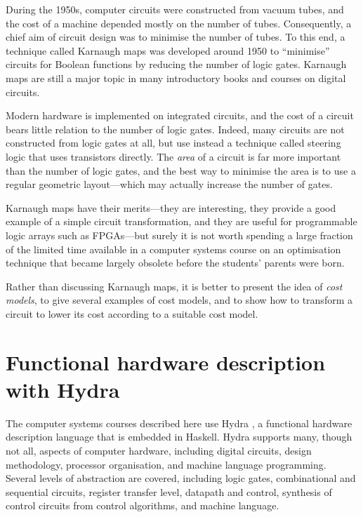 \documentclass[submission,copyright,creativecommons]{eptcs}
\begin{document}
During the 1950s, computer circuits were constructed from vacuum
tubes, and the cost of a machine depended mostly on the number of
tubes.  Consequently, a chief aim of circuit design was to minimise
the number of tubes.  To this end, a technique called Karnaugh maps
was developed around 1950 to ``minimise'' circuits for Boolean
functions by reducing the number of logic gates.  Karnaugh maps are
still a major topic in many introductory books and courses on digital
circuits.

Modern hardware is implemented on integrated circuits, and the cost of
a circuit bears little relation to the number of logic gates.  Indeed,
many circuits are not constructed from logic gates at all, but use
instead a technique called steering logic that uses transistors
directly.  The \emph{area} of a circuit is far more important than the
number of logic gates, and the best way to minimise the area is to use
a regular geometric layout---which may actually increase the number of
gates.

Karnaugh maps have their merits---they are interesting, they provide a
good example of a simple circuit transformation, and they are useful
for programmable logic arrays such as FPGAs---but surely it is not
worth spending a large fraction of the limited time available in a
computer systems course on an optimisation technique that became
largely obsolete before the students' parents were born.

Rather than discussing Karnaugh maps, it is better to present the idea
of \emph{cost models}, to give several examples of cost models, and to
show how to transform a circuit to lower its cost according to a
suitable cost model.

\section{Functional hardware description with Hydra}
\label{sec:hydra}

The computer systems courses described here use Hydra
\cite{2002-OD-PDSECA-Hydra}, a functional hardware description
language that is embedded in Haskell.  Hydra supports many, though
not all, aspects of computer hardware, including digital circuits,
design methodology, processor organisation, and machine language
programming.  Several levels of abstraction are covered, including
logic gates, combinational and sequential circuits, register
transfer level, datapath and control, synthesis of control circuits
from control algorithms, and machine language.
\end{document}
